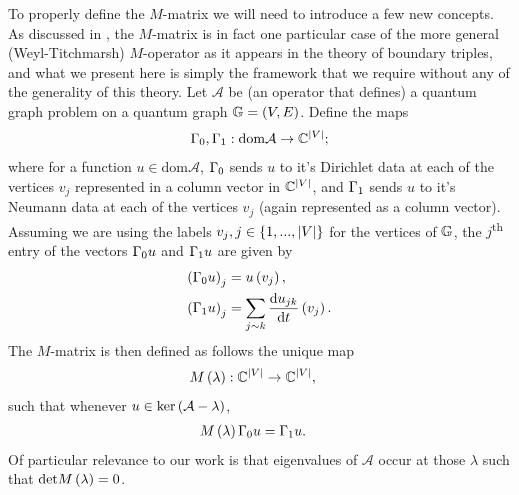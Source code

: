 To properly define the $M$-matrix we will need to introduce a few new concepts.
As discussed in , the $M$-matrix is in fact one particular case of the more general (Weyl-Titchmarsh) $M$-operator as it appears in the theory of boundary triples, and what we present here is simply the framework that we require without any of the generality of this theory.
Let $\mathcal{A}$ be (an operator that defines) a quantum graph problem on a quantum graph $\mathbb{G}=\left( V,E \right)$.
Define the maps
\begin{align*}
	\Gamma_0, \Gamma_1: \mathrm{dom}\mathcal{A} \rightarrow \mathbb{C}^{\left\lvert V \right\rvert};
\end{align*}
where for a function $u\in\mathrm{dom}\mathcal{A}$, $\Gamma_0$ sends $u$ to it's Dirichlet data at each of the vertices $v_j$ represented in a column vector in $\mathbb{C}^{\left\lvert V \right\rvert}$, and $\Gamma_1$ sends $u$ to it's Neumann data at each of the vertices $v_j$ (again represented as a column vector).
Assuming we are using the labels $v_j, j\in\left\{ 1,...,\left\lvert V \right\rvert \right\}$ for the vertices of $\mathbb{G}$, the $j$\textsuperscript{th} entry of the vectors $\Gamma_0 u$ and $\Gamma_1 u$ are given by
\begin{align*}
	\left( \Gamma_0 u \right)_j &= u\left( v_j \right), \\
	\left( \Gamma_1 u \right)_j &= \sum_{j\sim k}\dfrac{\mathrm{d}u_{jk}}{\mathrm{d}t}\left( v_j \right).
\end{align*}
The $M$-matrix is then defined as follows the unique map
\begin{align*}
	M\left( \lambda \right):\mathbb{C}^{\left\lvert V \right\rvert} &\rightarrow \mathbb{C}^{\left\lvert V \right\rvert},
\end{align*}
such that whenever $u\in\mathrm{ker}\left( \mathcal{A}-\lambda \right)$,
\begin{align*}
	M\left( \lambda \right)\Gamma_0 u &= \Gamma_1 u.
\end{align*}
Of particular relevance to our work is that eigenvalues of $\mathcal{A}$ occur at those $\lambda$ such that $\mathrm{det}M\left( \lambda \right) = 0$. 

